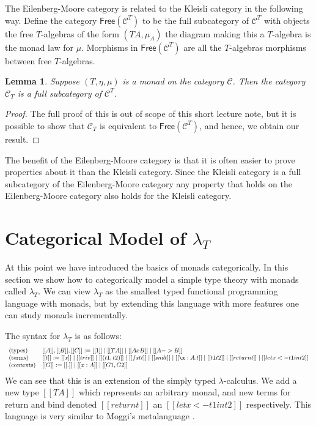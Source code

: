 \documentclass{article}
\newcommand{\cat}[1]{\mathcal{#1}}
\newtheorem{lemma}[theorem]{Lemma}
\begin{document}
The Eilenberg-Moore category is related to the Kleisli category in the
following way.  Define the category $\mathsf{Free}(\cat{C}^T)$ to be
the full subcategory of $\cat{C}^T$ with objects the free $T$-algebras
of the form $(TA,\mu_A)$ the diagram making this a $T$-algebra is the
monad law for $\mu$. Morphisms in $\mathsf{Free}(\cat{C}^T)$ are all
the $T$-algebras morphisms between free $T$-algebras.
\begin{lemma}
  \label{lemma:the_kleisli_category_is_a_full_subcategory_of_the_eilenberg-moore_category}
  Suppose $(T,\eta,\mu)$ is a monad on the category $\cat{C}$.  Then
  the category $\cat{C}_T$ is a full subcategory of $\cat{C}^T$.
\end{lemma}
\begin{proof}
  The full proof of this is out of scope of this short lecture note,
  but it is possible to show that $\cat{C}_T$ is equivalent to
  $\mathsf{Free}(\cat{C}^T)$, and hence, we obtain our result.
\end{proof}

The benefit of the Eilenberg-Moore category is that it is often easier
to prove properties about it than the Kleisli category.  Since the
Kleisli category is a full subcategory of the Eilenberg-Moore category
any property that holds on the Eilenberg-Moore category also holds for
the Kleisli category.  


\section{Categorical Model of $\lambda_T$}
\label{sec:categorical_model_of_lambdaT}

At this point we have introduced the basics of monads categorically.
In this section we show how to categorically model a simple type
theory with monads called $\lambda_T$.  We can view $\lambda_T$ as the
smallest typed functional programming language with monads, but by
extending this language with more features one can study monads
incrementally.

The syntax for $\lambda_T$ is as follows:
\[
\small
\begin{array}{lll}
  \text{(types)}  & [[A]],[[B]],[[C]] := [[1]] \mid [[T A]] \mid [[A x B]] \mid [[A -> B]]\\
  \text{(terms)} & [[t]] := [[x]] \mid [[triv]] \mid [[(t1,t2)]] \mid [[fst t]] \mid [[snd t]] \mid [[\x:A.t]] \mid [[t1 t2]] \mid [[return t]] \mid [[let x <- t1 in t2]]\\
  \text{(contexts)} & [[G]] := [[.]] \mid [[x : A]] \mid [[G1,G2]]
\end{array}
\]
We can see that this is an extension of the simply typed
$\lambda$-calculus.  We add a new type $[[T A]]$ which represents an
arbitrary monad, and new terms for return and bind denoted $[[return
    t]]$ an $[[let x <- t1 in t2]]$ respectively.  This language is
very similar to Moggi's metalanguage \cite{Moggi:1988}.
\end{document}
